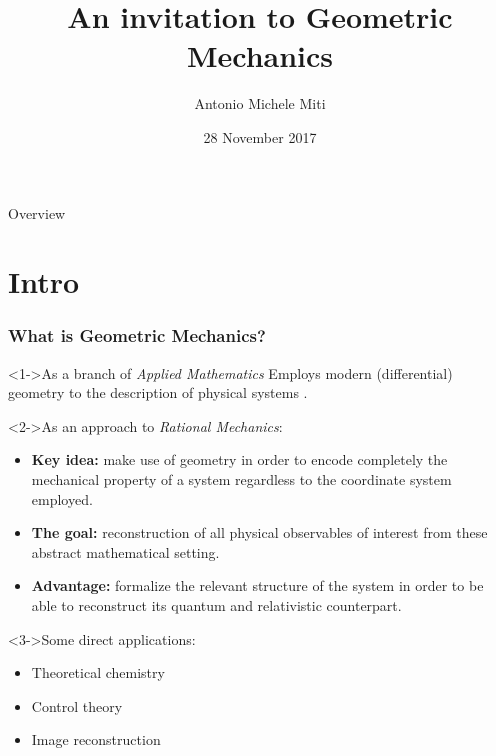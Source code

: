 \documentclass[8pt,handout]{beamer}
\title{An invitation to Geometric Mechanics}
\author{Antonio Michele Miti}
\date{28 November 2017}
\begin{document}

\ifToninus
\else
	\frame{\titlepage}
\fi

\ifToninus
	\begin{frame}{Overview}
		\tableofcontents
	\end{frame}
\else

\fi

\section{Intro}	

	\begin{frame}
		\frametitle{What is Geometric Mechanics?}
		\begin{block}<1->{As a branch of \emph{Applied Mathematics}}
			Employs modern (differential) geometry to the description of physical systems	.		
		\end{block}
		\begin{block}<2->{As an approach to \emph{Rational Mechanics}:}
			\begin{itemize}
				\item \textbf{Key idea:} make use of geometry in order to encode completely the mechanical property of a system regardless to the coordinate system employed.
				\item \textbf{The goal:} reconstruction of all physical observables of interest from these abstract mathematical setting.
				\item \textbf{Advantage:} formalize the relevant structure of the system in order to be able to reconstruct its quantum and relativistic counterpart.
			\end{itemize}
			
		\end{block}
			\begin{exampleblock}<3->{Some direct applications:}
			\begin{itemize}
				\item Theoretical chemistry 
				\item Control theory
				\item Image reconstruction
			\end{itemize}
			\end{exampleblock}




	\end{frame}
\end{document}
